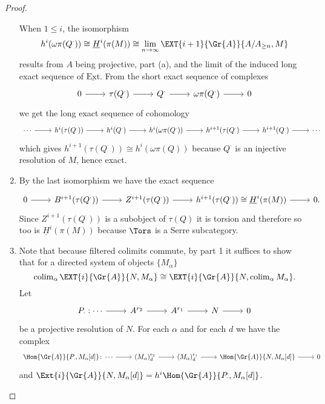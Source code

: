 \documentclass[10pt]{amsart}
\begin{document}
\begin{prop}
\begin{proof}
\begin{enumerate}
      When $1 \leq i$, the isomorphism 
      $$h^i(\omega\pi(Q^\cdot)) \cong \underline{H}^i(\pi(M)) \cong \lim_{n \rightarrow \infty}\EXT{i+1}{\Gr{A}}{A/A_{\geq n}, M}$$ 
      results from $A$ being projective, part (a), and the limit of the induced long exact sequence of $\operatorname{\underline{Ext}}$.
      From the short exact sequence of complexes
      $$\begin{tikzcd}
        0 \arrow{r} & \tau(Q^\cdot) \arrow{r} & Q^\cdot \arrow{r} & \omega\pi(Q^\cdot) \arrow{r} & 0
      \end{tikzcd}$$
      we get the long exact sequence of cohomology
      $$\begin{tikzcd}
        \cdots \arrow{r} & h^i(\tau(Q^\cdot)) \arrow{r} & h^i(Q^\cdot) \arrow{r} & h^i(\omega\pi(Q^\cdot)) \arrow{r} & h^{i+1}(\tau(Q^\cdot) \arrow{r} & h^{i+1}(Q^\cdot) \arrow{r} & \cdots
      \end{tikzcd}$$
      which gives $h^{i+1}(\tau(Q^\cdot)) \cong h^i(\omega\pi(Q))$ because $Q^\cdot$ is an injective resolution of $M$, hence exact.
    \item
      By the last isomorphism we have the exact sequence
      $$\begin{tikzcd}
        0 \arrow{r} & B^{i+1}(\tau(Q^\cdot)) \arrow{r} & Z^{i + 1} (\tau(Q^\cdot)) \arrow{r} & h^{i+1}(\tau(Q^\cdot)) \cong \underline{H}^i(\pi(M)) \arrow{r} & 0.
      \end{tikzcd}$$
      Since $Z^{i+1}(\tau(Q^\cdot))$ is a subobject of $\tau(Q)$ it is torsion and therefore so too is $\underline{H}^i(\pi(M))$ because $\Tors$ is a Serre subcategory.
    \item
      Note that because filtered colimits commute, by part 1 it suffices to show that for a directed system of objects $\{M_\alpha\}$
      $$\operatorname{colim}_{\alpha}\EXT{i}{\Gr{A}}{N,M_\alpha} \cong \EXT{i}{\Gr{A}}{N,\operatorname{colim}_{\alpha} M_\alpha}.$$
      Let 
      $$\begin{tikzcd}
        P_\cdot : \cdots \arrow{r} & A^{r_2} \arrow{r} & A^{r_1} \arrow{r} & N \arrow{r} & 0
      \end{tikzcd}$$
      be a projective resolution of $N$.
      For each $\alpha$ and for each $d$ we have the complex
      $$\begin{tikzcd}
        \Hom{\Gr{A}}{P_\cdot, M_\alpha[d]} \colon \cdots \arrow{r} & (M_\alpha)_d^{r_2} \arrow{r} & (M_\alpha)_d^{r_1} \arrow{r} & \Hom{\Gr{A}}{N, M_\alpha[d]} \arrow{r} & 0
      \end{tikzcd}$$
      and $\Ext{i}{\Gr{A}}{N, M_\alpha[d]} = h^i\Hom{\Gr{A}}{P_\cdot, M_\alpha[d]}$.

\end{enumerate}
\end{proof}
\end{prop}
\end{document}
